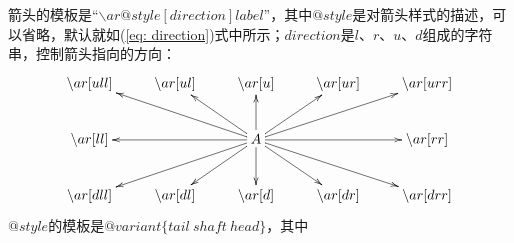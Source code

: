 \documentclass[openany]{ctexart}
\theoremstyle{definition}
\begin{document}
箭头的模板是``$\backslash ar @style [direction] label$''，其中$@style$是对箭头样式的描述，可以省略，默认就如(\ref{eq: direction})式中所示；$direction$是$l$、$r$、$u$、$d$组成的字符串，控制箭头指向的方向：
\begin{align} \label{eq: direction}
\begin{split}
\xymatrix{
\backslash ar[ull] & \backslash ar[ul] & \backslash ar[u] & \backslash ar[ur] & \backslash ar[urr] \\
\backslash ar[ll] & & A \ar[ull] \ar[ul] \ar[u] \ar[ur] \ar[urr] \ar[ll] \ar[rr] \ar[dll] \ar[dl] \ar[d] \ar[dr] \ar[drr] & & \backslash ar[rr] \\
\backslash ar[dll] & \backslash ar[dl] & \backslash ar[d] & \backslash ar[dr] & \backslash ar[drr]
} 
\end{split}
\end{align}
$@style$的模板是$@variant\{tail~shaft~head\}$，其中
\end{document}
